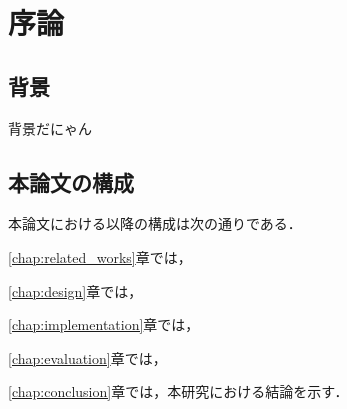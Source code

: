 \chapter{序論}
\label{chap:introduction}

\section{背景}
\label{section:background}

背景だにゃん

\section{本論文の構成}

本論文における以降の構成は次の通りである．

\ref{chap:related_works}章では，

\ref{chap:design}章では，

\ref{chap:implementation}章では，

\ref{chap:evaluation}章では，

\ref{chap:conclusion}章では，本研究における結論を示す．

